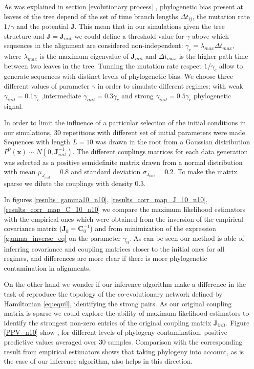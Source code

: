 \documentclass[preprint,amsmath,amssymb,superscriptaddress,showpacs,pre]{revtex4-1}
\begin{document}
As was explained in section \ref{evolutionary process} , phylogenetic bias present at leaves of the tree depend of the set of time branch lengths  $\Delta t_{ij}$, the mutation rate $1/\gamma$ and the potential $\bm J$. This mean that in our simulations given the tree structure and $\bm J=\bm J_{init}$  we could define a threshold value for $\gamma$ above which  sequences in the  alignment are considered  non-independent: $\gamma_c=\lambda_{max}  \Delta t_{max}$, where  $\lambda_{max}$ is the maximum eigenvalue of $\bm J_{init}$ and $\Delta t_{max}$ is the  higher path time between two leaves in the tree.   Tunning the mutation rate respect $1/\gamma_c$ allow to generate sequences with distinct levels of phylogenetic bias. We choose three different values of parameter $\gamma$ in order to simulate  different regimes: with weak  $\gamma_{init}=0.1\gamma_c$ ,intermediate $\gamma_{init}=0.3\gamma_c$ and  strong  $\gamma_{init}=0.5\gamma_c$  phylogenetic signal. 

In order to limit the influence of a particular selection of the initial conditions in our simulations,  30 repetitions with different set of initial parameters were made.  Sequences with length $L=10$  was drawn in the root from a Gaussian distribution $P^0(\mathbf{ x})\sim N(0,\bm J_{init}^{-1})$. The different couplings matrices for each data generation was selected as a positive semidefinite matrix drawn from a normal distribution with mean $\mu_{J_{init}}=0.8$ and standard deviation $\sigma_{J_{init}}=0.2$. To make the matrix sparse we dilute the couplings with density $0.3$. 

In figures \ref{results_gamma10_n10},  \ref{results_corr_map_J_10_n10}, \ref{results_corr_map_C_10_n10} we compare the maximum likelihood estimators with the empirical ones which were obtained  from the inversion of the empirical covariance matrix ($\bm J_0=\bm C^{-1}_0$) and from minimization of the expression \ref{gamma_inverse_eq} on the parameter $\gamma_0$.  As can be seen    our method is able of inferring covariance and  coupling matrices closer to the initial  ones for all regimes, and  differences are more clear if there is more phylogenetic contamination in  alignments. 


On the other hand we wonder if our inference algorithm make a difference in the task of  reproduce the topology of the co-evolutionary network defined by Hamiltonian \ref{eq:equil}, identifying the strong pairs. As our original coupling matrix is sparse  we could explore the ability of maximum likelihood estimators to identify the strongest non-zero entries of the original coupling matrix $\bm J_{init}$.  Figure \ref{PPV_n10} show , for different levels of phylogeny contamination,  positive predictive values averaged over 30 samples. Comparison with the corresponding result from empirical estimators  shows that taking phylogeny into account, as is the case of our inference algorithm, also helps in this direction.
\end{document}
